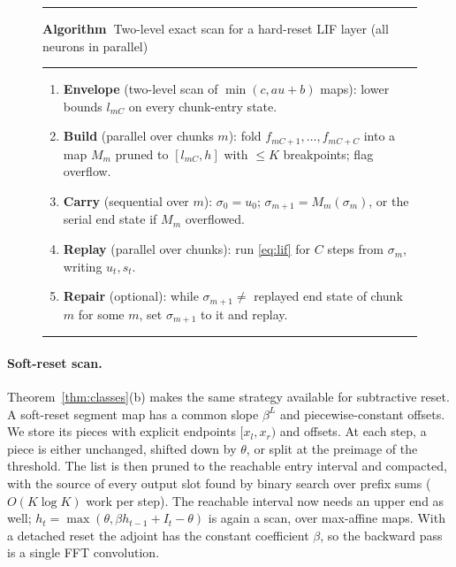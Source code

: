 \documentclass[10pt]{article}
\newcounter{algo}
\renewcommand{\thealgo}{\arabic{algo}}
\theoremstyle{remark}
\begin{document}
\begin{figure}[t]
\label{alg:twolevel}
\hrule\smallskip
\noindent\textbf{Algorithm~\thealgo}\quad Two-level exact scan for a hard-reset LIF layer (all neurons in parallel)
\smallskip\hrule
\begin{enumerate}[leftmargin=2em,label=\arabic*:]
\item \textbf{Envelope} (two-level scan of $\min(c,au+b)$ maps): lower bounds $l_{mC}$ on every chunk-entry state.
\item \textbf{Build} (parallel over chunks $m$): fold $f_{mC+1},\ldots,f_{mC+C}$ into a map $M_m$ pruned to $[l_{mC},h]$ with $\le K$ breakpoints; flag overflow.
\item \textbf{Carry} (sequential over $m$): $\sigma_0=u_0$; $\sigma_{m+1}=M_m(\sigma_m)$, or the serial end state if $M_m$ overflowed.
\item \textbf{Replay} (parallel over chunks): run \eqref{eq:lif} for $C$ steps from $\sigma_m$, writing $u_t,s_t$.
\item \textbf{Repair} (optional): while $\sigma_{m+1}\neq$ replayed end state of chunk $m$ for some $m$, set $\sigma_{m+1}$ to it and replay.
\end{enumerate}
\hrule
\end{figure}

\paragraph{Soft-reset scan.}
Theorem~\ref{thm:classes}(b) makes the same strategy available for subtractive reset. A soft-reset segment map has a common slope $\beta^L$ and piecewise-constant offsets. We store its pieces with explicit endpoints $[x_l,x_r)$ and offsets. At each step, a piece is either unchanged, shifted down by $\theta$, or split at the preimage of the threshold. The list is then pruned to the reachable entry interval and compacted, with the source of every output slot found by binary search over prefix sums ($O(K\log K)$ work per step). The reachable interval now needs an upper end as well; $h_t=\max(\theta,\beta h_{t-1}+I_t-\theta)$ is again a scan, over max-affine maps. With a detached reset the adjoint has the constant coefficient $\beta$, so the backward pass is a single FFT convolution.
\end{document}
